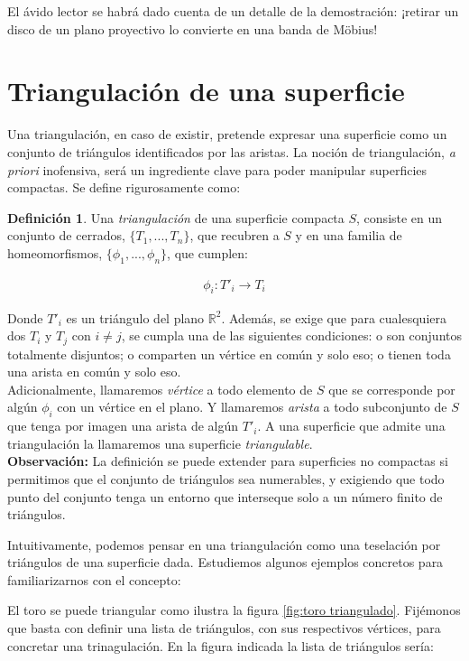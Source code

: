 \documentclass[a4paper,11pt,spanish, twoside, leqno]{tfg-uam}
\theoremstyle{definition}
\newtheorem{defin}[teor]{Definici\'on}
\begin{document}
El ávido lector se habrá dado cuenta de un detalle de la demostración: ¡retirar un disco de un plano proyectivo lo convierte en una banda de M\"obius!


\section{Triangulación de una superficie}
\label{seccion de triangulacion}
Una triangulación, en caso de existir, pretende expresar una superficie como un conjunto de triángulos identificados por las aristas. La noción de triangulación, \textit{a priori} inofensiva, será un ingrediente clave para poder manipular superficies compactas. Se define rigurosamente como:

\begin{defin}\label{defin:triangulacion}
Una \textit{triangulación} de una superficie compacta $S$, consiste en un conjunto de cerrados, $\{T_1, ..., T_n\}$, que recubren a $S$ y en una familia de homeomorfismos, $\{\phi_1, ..., \phi_n\}$, que cumplen:

\begin{align*}
	\phi_i: T'_i \longrightarrow T_i
\end{align*}

Donde $T'_i$ es un triángulo del plano $\mathbb{R}^2$.
Además, se exige que para cualesquiera dos $T_i$ y $T_j$ con $i\neq j$, se cumpla una de las siguientes condiciones: o son conjuntos totalmente disjuntos; o comparten un vértice en común y solo eso; o tienen toda una arista en común y solo eso.\\
Adicionalmente, llamaremos \textit{vértice} a todo elemento de $S$ que se corresponde por algún $\phi_i$ con un vértice en el plano. Y llamaremos \textit{arista} a todo subconjunto de $S$ que tenga por imagen una arista de algún $T'_i$. A una superficie que admite una triangulación la llamaremos una superficie \textit{triangulable}.\\
\textbf{Observación:} La definición se puede extender para superficies no compactas si permitimos que el conjunto de triángulos sea numerables, y exigiendo que todo punto del conjunto tenga un entorno que interseque solo a un número finito de triángulos.
\end{defin}


Intuitivamente, podemos pensar en una triangulación como una teselación por triángulos de una superficie dada. Estudiemos algunos ejemplos concretos para familiarizarnos con el concepto:

El toro se puede triangular como ilustra la figura  \ref{fig:toro triangulado}. Fijémonos que basta con definir una lista de triángulos, con sus respectivos vértices, para concretar una trinagulación. En la figura indicada la lista de triángulos sería:
\end{document}
